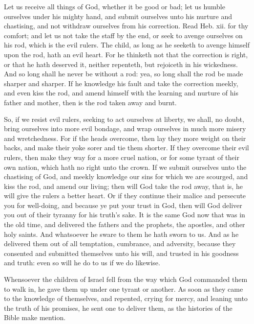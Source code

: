 Let us receive all things of God, whether it be good or 
bad; let us humble ourselves under his mighty hand, and 
submit ourselves unto his nurture and chastising, and not 
withdraw ourselves from his correction. Read Heb. xii.
for thy comfort; and let us not take the staff by the end, 
or seek to avenge ourselves on his rod, which is the evil 
rulers. The child, as long as he seeketh to avenge himself
upon the rod, hath an evil heart. For he thinketh 
not that the correction is right, or that he hath deserved it, 
neither repenteth, but rejoiceth in his wickedness. And 
so long shall he never be without a rod: yea, so long 
shall the rod be made sharper and sharper. If he knowledge
his fault and take the correction meekly, and even 
kiss the rod, and amend himself with the learning and 
nurture of his father and mother, then is the rod taken
away and burnt. 

So, if we resist evil rulers, seeking to act ourselves at 
liberty, we shall, no doubt, bring ourselves into more 
evil bondage, and wrap ourselves in much more misery 
and wretchedness. For if the heads overcome, then 
lay they more weight on their backs, and make their 
yoke sorer and tie them shorter. If they overcome their 
evil rulers, then make they way for a more cruel nation, or 
for some tyrant of their own nation, which hath no right 
unto the crown. If we submit ourselves unto the chastising
of God, and meekly knowledge our sins for which 
we are scourged, and kiss the rod, and amend our living;
then will God take the rod away, that is, he will give the 
rulers a better heart. Or if they continue their malice 
and persecute you for well-doing, and because ye put your 
trust in God, then will God deliver you out of their 
tyranny for his truth's sake. It is the same God now that 
was in the old time, and delivered the fathers and the 
prophets, the apostles, and other holy saints. And whatsoever
he sware to them he hath sworn to us. And as he 
delivered them out of all temptation, cumbrance, and adversity,
because they consented and submitted themselves 
unto his will, and trusted in his goodness and truth: even 
so will he do to us if we do likewise. 

Whensoever the children of Israel fell from the way 
which God commanded them to walk in, he gave them up 
under one tyrant or another. As soon as they came to the 
knowledge of themselves, and repented, crying for mercy, 
and leaning unto the truth of his promises, he sent one to 
deliver them, as the histories of the Bible make mention.

